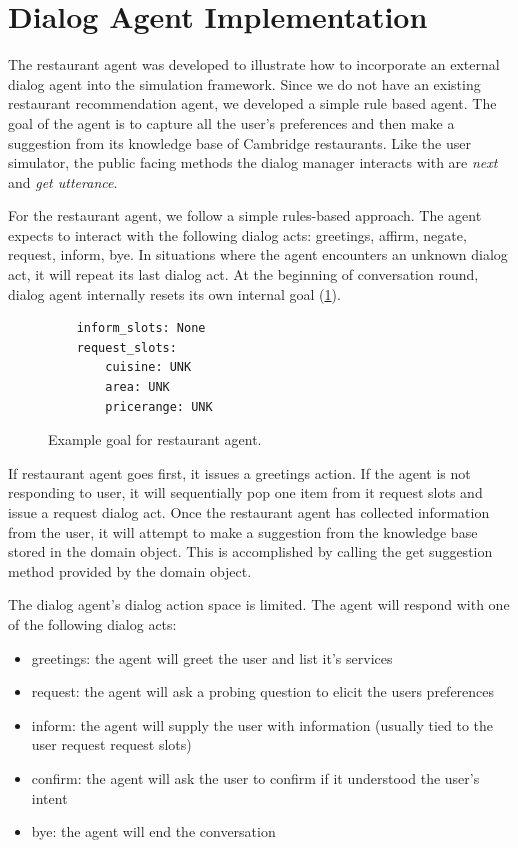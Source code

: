 \section{Dialog Agent Implementation}

The restaurant agent was developed to illustrate how to incorporate an external dialog agent into the simulation framework. Since we do not have an existing restaurant recommendation agent, we developed a simple rule based agent. The goal of the agent is to capture all the user's preferences and then make a suggestion from its knowledge base of Cambridge restaurants. Like the user simulator, the public facing methods the dialog manager interacts with are \textit{next} and \textit{get utterance}. 

For the restaurant agent, we follow a simple rules-based approach. The agent expects to interact with the following dialog acts: greetings, affirm, negate, request, inform, bye. In situations where the agent encounters an unknown dialog act, it will repeat its last dialog act. At the beginning of conversation round, dialog agent internally resets its own internal goal (\ref{fig:ex_res_agent_goal}). 

 \begin{figure}[h!]
 	\begin{lstlisting}
 	inform_slots: None
 	request_slots:
 		cuisine: UNK
 		area: UNK
 		pricerange: UNK 	
 	\end{lstlisting}
 	\caption{ Example goal for restaurant agent.}
 	\label{fig:ex_res_agent_goal}
 \end{figure}

If restaurant agent goes first, it issues a greetings action. If the agent is not responding to user, it will sequentially pop one item from it request slots and issue a request dialog act. Once the restaurant agent has collected information from the user, it will attempt to make a suggestion from the knowledge base stored in the domain object. This is accomplished by calling the get suggestion method provided by the domain object.

The dialog agent's dialog action space is limited. The agent will respond with one of the following dialog acts:
\begin{itemize}
	\item greetings: the agent will greet the user and list it's services
	\item request: the agent will ask a probing question to elicit the users preferences
	\item inform: the agent will supply the user with information (usually tied to the user request request slots)
	\item confirm: the agent will ask the user to confirm if it understood the user's intent 
	\item bye: the agent will end the conversation  
\end{itemize}

